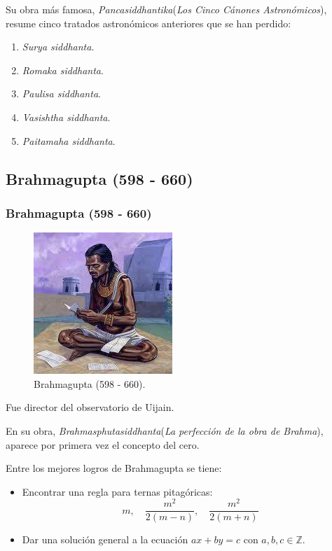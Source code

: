 \documentclass[compress, aspectratio=169]{beamer} %
\begin{document}
		\begin{frame}
			Su obra más famosa, \textit{Pancasiddhantika}(\textit{Los Cinco Cánones Astronómicos}), resume cinco tratados
			astronómicos anteriores que se han perdido:
			\begin{enumerate}
				\item \textit{Surya siddhanta}.
				\item \textit{Romaka siddhanta}.
				\item \textit{Paulisa siddhanta}.
				\item \textit{Vasishtha siddhanta}.
				\item \textit{Paitamaha siddhanta}.
			\end{enumerate}
		\end{frame}
		
	\subsection{Brahmagupta (598 - 660)}
		\begin{frame}
			\frametitle{Brahmagupta (598 - 660)}
			\begin{figure}
				\centering
				\includegraphics[width = .3\linewidth]{brahmagupta.jpg}
				\caption{Brahmagupta (598 - 660).}
			\end{figure}
		\end{frame}

		\begin{frame}
			Fue director del observatorio de Uijain.

			En su obra, \textit{Brahmasphutasiddhanta}(\textit{La perfección de la obra de Brahma}), aparece por
			primera vez el concepto del cero.
	
			Entre los mejores logros de Brahmagupta se tiene:
			\begin{itemize}
				\item Encontrar una regla para ternas pitagóricas:
				$$ m, \quad {\frac{m^{2}}{2(m-n)}}, \quad {\frac{m^{2}}{2(m+n)}}$$
				\item Dar una solución general a la ecuación $ax + by = c$ con $a,b,c \in \mathbb {Z}$.
			\end{itemize}
		\end{frame}
\end{document}
